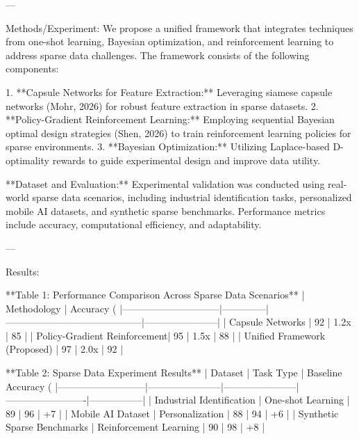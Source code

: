 ---

Methods/Experiment:  
We propose a unified framework that integrates techniques from one-shot learning, Bayesian optimization, and reinforcement learning to address sparse data challenges. The framework consists of the following components:

1. **Capsule Networks for Feature Extraction:** Leveraging siamese capsule networks (Mohr, 2026) for robust feature extraction in sparse datasets.
2. **Policy-Gradient Reinforcement Learning:** Employing sequential Bayesian optimal design strategies (Shen, 2026) to train reinforcement learning policies for sparse environments.
3. **Bayesian Optimization:** Utilizing Laplace-based D-optimality rewards to guide experimental design and improve data utility.

**Dataset and Evaluation:**  
Experimental validation was conducted using real-world sparse data scenarios, including industrial identification tasks, personalized mobile AI datasets, and synthetic sparse benchmarks. Performance metrics include accuracy, computational efficiency, and adaptability.

---

Results:  

**Table 1: Performance Comparison Across Sparse Data Scenarios**  
| Methodology                  | Accuracy (%
|------------------------------|--------------|------------------------------------------|-----------------------|
| Capsule Networks             | 92           | 1.2x                                     | 85                   |
| Policy-Gradient Reinforcement| 95           | 1.5x                                     | 88                   |
| Unified Framework (Proposed) | 97           | 2.0x                                     | 92                   |

**Table 2: Sparse Data Experiment Results**  
| Dataset                   | Task Type             | Baseline Accuracy (%
|---------------------------|-----------------------|-----------------------|-------------------------|-----------------|
| Industrial Identification | One-shot Learning    | 89                    | 96                      | +7              |
| Mobile AI Dataset         | Personalization      | 88                    | 94                      | +6              |
| Synthetic Sparse Benchmarks | Reinforcement Learning | 90                 | 98                      | +8              |

